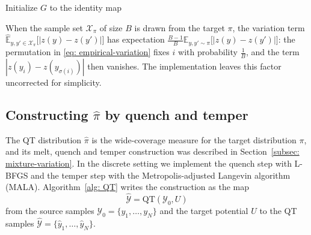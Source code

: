 \documentclass{article}
\begin{document}
\begin{algorithm}[htb]
\caption{KLXX training algorithm}
\label{alg: training}
Initialize $G$ to the identity map\;
\end{algorithm}

\begin{remark}{
	When the sample set $\mathcal X_{\pi}$ of size $B$ is drawn from the target $\pi$, the variation term $\widehat{\mathbb E}_{y,y'\in \mathcal X_{\pi}} \big[|z(y)-z(y')|\big]$ has expectation $\frac{B-1}{B}\mathbb E_{y,y'\sim\pi}\big[|z(y)-z(y')|\big]$: the permutation in \eqref{eq: empirical-variation} fixes $i$ with probability $\frac1B$, and the term $|z(y_i)-z(y_{\sigma(i)})|$ then vanishes. The implementation leaves this factor uncorrected for simplicity.}
\end{remark}

\subsection{Constructing \texorpdfstring{$\hat\pi$}{pi-hat} by quench and temper}
\label{subsec: QT}

The QT distribution $\hat\pi$ is the wide-coverage measure for the target distribution $\pi$, and its melt, quench and temper construction was described in Section~\ref{subsec: mixture-variation}. In the discrete setting we implement the quench step with L-BFGS \citep{liu1989limited} and the temper step with the Metropolis-adjusted Langevin algorithm (MALA). Algorithm~\ref{alg: QT} writes the construction as the map
\begin{equation*}
    \hat{\mathcal Y} = \mathrm{QT}(\mathcal Y_0,U)
\end{equation*}
from the source samples $\mathcal Y_0=\{y_1,\dots,y_N\}$ and the target potential $U$ to the QT samples $\hat{\mathcal Y}=\{\hat y_1,\dots,\hat y_N\}$.
\end{document}
